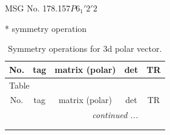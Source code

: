 \documentclass[fleqn,8pt]{jsarticle}
\begin{document}
\setcounter{MaxMatrixCols}{32}

\renewcommand{\tablename}{Table~}
\renewcommand{\figurename}{Figure~}
\begin{center}
\LARGE
MSG No. 178.157\quad$P6_{1}'2'2$
\end{center}
* symmetry operation
\renewcommand{\arraystretch}{1.3}
\begin{longtable}{ccccc}
\caption{Symmetry operations for 3d polar vector.}
 \\
 \hline \hline
No. & tag & matrix (polar) & det & TR \\ \hline \endfirsthead

\multicolumn{4}{l}{\tablename\ \thetable{}} \\
 \hline \hline
No. & tag & matrix (polar) & det & TR \\ \hline \endhead

 \hline \hline
\multicolumn{4}{r}{\footnotesize\it continued ...} \\ \endfoot

 \hline \hline
\multicolumn{4}{r}{} \\ \endlastfoot


\end{longtable}
\end{document}
